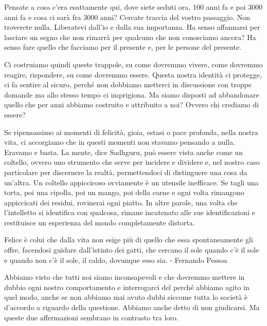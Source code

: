 \documentclass[12pt]{book} %
\begin{document}
\begin{mdframed}[linewidth=1pt]
Pensate a cosa c'era esattamente qui, dove siete seduti ora, 100 anni fa e poi 3000 anni fa e cosa ci sarà fra 3000
anni? Cercate traccia del vostro passaggio. Non troverete nulla. Liberatevi dall'io e dalla sua importanza. Ha senso
affannarsi per lasciare un segno che non rimarrà per qualcuno che non conosciamo ancora? Ha senso fare quello che
facciamo per il presente e, per le persone del presente.
\end{mdframed}

Ci costruiamo quindi queste trappole, su come dovremmo vivere, come dovremmo reagire, rispondere, su come dovremmo
essere. Questa nostra identità ci protegge, ci fa sentire al sicuro, perché non dobbiamo metterci in discussione con
troppe domande ma allo stesso tempo ci imprigiona. Ma siamo disposti ad abbandonare quello che per anni abbiamo
costruito e attribuito a noi? Ovvero chi crediamo di essere? 

Se ripensassimo ai momenti di felicità, gioia, estasi o pace profonda, nella nostra vita, ci accorgiamo che in questi
momenti non stavamo pensando a nulla. Eravamo e basta. La mente, dice Sadhguru, può essere vista anche come un
coltello, ovvero uno strumento che serve per incidere e dividere e, nel nostro caso particolare per discernere la
realtà, permettendoci di distinguere una cosa da un'altra. Un coltello appiccicoso ovviamente è un utensile inefficace.
Se tagli una torta, poi una cipolla, poi un mango, poi della carne e ogni volta rimangono appiccicati dei residui,
rovinerai ogni piatto. In altre parole, una volta che l'intelletto si identifica con qualcosa, rimane incatenato alle
sue identificazioni e restituisce un esperienza del mondo completamente distorta.

Felice è colui che dalla vita non esige più di quello che essa spontaneamente gli offre, facendosi guidare dall'istinto
dei gatti, che cercano il sole quando c'è il sole e quando non c'è il sole, il caldo, dovunque esso sia. - Fernando
Pessoa

Abbiamo visto che tutti noi siamo inconsapevoli e che dovremmo mettere in dubbio ogni nostro comportamento e
interrogarci del perché abbiamo agito in quel modo, anche se non abbiamo mai avuto dubbi siccome tutta lo società è
d'accordo a riguardo della questione. Abbiamo anche detto di non giudicarsi. Ma queste due
affermazioni sembrano in contrasto tra loro.
\end{document}
